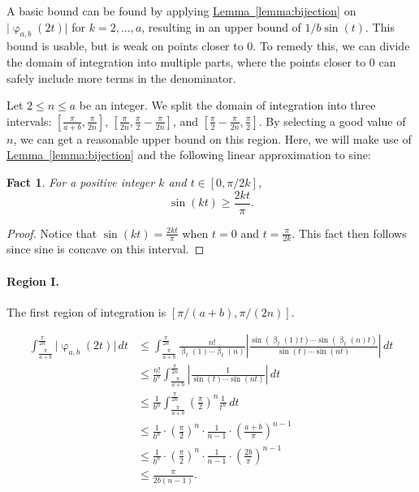 \documentclass[11pt]{article}
\numberwithin{equation}{section}
\newtheorem{fact}[theorem]{Fact}
\theoremstyle{definition}
\theoremstyle{plain}
\newcommand{\expref}[2]{\hyperref[#2]{#1~\ref{#2}}}
\DeclareMathOperator{\charfn}{\varphi}
\DeclareMathOperator{\bij}{\beta}
\begin{document}
A basic bound can be found by applying \expref{Lemma}{lemma:bijection} on $\lvert\charfn_{a,b}(2t)\rvert$ for $k=2,\dots,a$, resulting in an upper bound of $1/b\sin(t)$. This bound is usable, but is weak on points closer to 0. To remedy this, we can divide the domain of integration into multiple parts, where the points closer to 0 can safely include more terms in the denominator.

Let $2\le n\le a$ be an integer. We split the domain of integration into three intervals: $[\frac{\pi}{a+b}, \frac{\pi}{2n}]$, $[\frac{\pi}{2n},  \frac{\pi}{2}- \frac{\pi}{2n}]$, and $[\frac{\pi}{2}-\frac{\pi}{2n},\frac{\pi}{2}]$. By selecting a good value of $n$, we can get a reasonable upper bound on this region.
Here, we will make use of \expref{Lemma}{lemma:bijection} and the following linear approximation to sine: 

\begin{fact}
    \label{fact:linearlowerbound}
    For a positive integer $k$ and $t\in [0, \pi/2k]$,
    \[\sin(kt)\ge \frac{2kt}{\pi }. \]
\end{fact}

\begin{proof}
    Notice that $\sin(kt)=\frac{2kt}{\pi}$ when $t=0$ and $t=\frac{\pi}{2k}$. This fact then follows since sine is concave on this interval.     
\end{proof}

\paragraph{Region I.}

The first region of integration is $[\pi/(a+b),\pi/(2n)]$.

\begin{align*}
    \int_{\frac{\pi}{a+b}}^{\frac{\pi}{2n}} \lvert\charfn_{a,b}(2t)\rvert\,dt &\le  \int_{\frac{\pi}{a+b}}^{\frac{\pi}{2n}} \frac{n!}{\bij_t(1)\cdots \bij_t(n)} \left\lvert \frac{\sin(\bij_t(1)t)\cdots \sin(\bij_t(n)t)}{\sin(t)\cdots \sin(nt)}\right\rvert \, dt \\
    &\le \frac{n!}{b^n}\int_{\frac{\pi}{a+b}}^{\frac{\pi}{2n}} \left\lvert\frac{1}{\sin(t)\cdots \sin(nt)} \right\rvert\,dt \\
    &\le \frac{1}{b^n}\int_{\frac{\pi}{a+b}}^{\frac{\pi}{2n}} \left(\frac{\pi}{2}\right)^n \frac{1}{t^n}\,dt\\
    &\le \frac{1}{b^n}\cdot \left(\frac{\pi}{2}\right)^n \cdot\frac{1}{n-1}\cdot \left(\frac{a+b}{\pi}\right)^{n-1}\\
    &\le \frac{1}{b^n}\cdot \left(\frac{\pi}{2}\right)^n \cdot\frac{1}{n-1}\cdot \left(\frac{2b}{\pi}\right)^{n-1}\\
    &\le \frac{\pi}{2b(n-1)}.
\end{align*}
\end{document}
